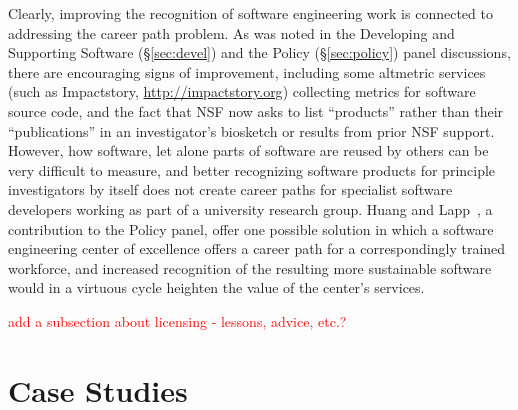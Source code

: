 \documentclass[11pt, oneside]{amsart}
\newcommand{\note}[1]{ {\textcolor{red}    { #1 }}}
\begin{document}
Clearly, improving the recognition of software engineering work is
connected to addressing the career path problem. As was noted in the
Developing and Supporting Software (\S\ref{sec:devel}) and the Policy
(\S\ref{sec:policy}) panel discussions, there are encouraging signs of
improvement, including some altmetric services (such as Impactstory,
\url{http://impactstory.org}) collecting metrics for software source
code, and the fact that NSF now asks to list ``products'' rather than
their ``publications'' in an investigator's biosketch or results from
prior NSF support. However, how software, let alone parts of software
are reused by others can be very difficult to measure, and better
recognizing software products for principle investigators by itself
does not create career paths for specialist software developers
working as part of a university research group. Huang and
Lapp~\cite{Huang_WSSSPE}, a contribution to the Policy panel, offer
one possible solution in which a software engineering center of
excellence offers a career path for a correspondingly trained
workforce, and increased recognition of the resulting more sustainable
software would in a virtuous cycle heighten the value of the center's
services.

\note{add a subsection about licensing - lessons, advice, etc.?}

\section{Case Studies} \label{sec:use-cases} %


\end{document}
